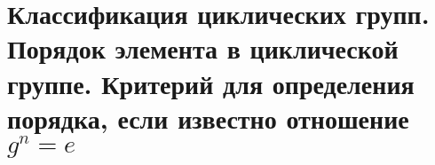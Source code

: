 % 
% 
\section{Классификация циклических групп. Порядок элемента в циклической группе. Критерий для определения порядка, если известно отношение $ g^{n}=e$}
% 

